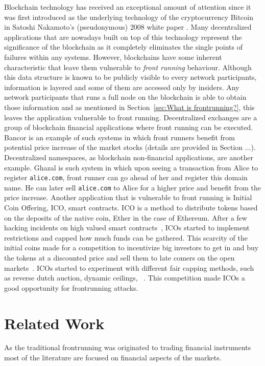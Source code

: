 Blockchain technology has received an exceptional amount of attention since it was first introduced as the underlying technology of the cryptocurrency Bitcoin in Satoshi Nakamoto's (pseudonymous) 2008 white paper \cite{nakamoto2008bitcoin}. Many decentralized applications that are nowadays built on top of this technology represent the significance of the blockchain as it completely eliminates the single points of failures within any systems. However, blockchains have some inherent characteristic that leave them vulnerable to \emph{front running} behaviour. Although this data structure is known to be publicly visible to every network participants, information is layered  and some of them are accessed only by insiders. Any network participants that runs a full node on the blockchain is able to obtain those information and as mentioned in Section~\ref{sec:What is frontrunning?}, this leaves the application vulnerable to front running. Decentralized exchanges are a group of blockchain financial applications where front running can be executed. Bancor \cite{hertzog2017bancor} is an example of such systems in which front runners benefit from potential price increase of the market stocks (details are provided in Section ...). Decentralized namespaces, as blockchain non-financial applications, are another example. Ghazal \cite{moosavighazal} is such system in which upon seeing a transaction from Alice to register \texttt{alice.com}, front runner can go ahead of her and register this domain name. He can later sell \texttt{alice.com} to Alice for a higher price and benefit from the price increase.
Another application that is vulnerable to front running is Initial Coin Offering, ICO, smart contracts. ICO is a method to distribute tokens based on the deposits of the native coin, Ether in the case of Ethereum. After a few hacking incidents on high valued smart contracts~\cite{siegel2016daohack}, ICOs started to implement restrictions and capped how much funds can be gathered. This scarcity of the initial coins made for a competition to incentivize big investors to get in and buy the tokens at a discounted price and sell them to late comers on the open markets~\cite{zetzsche2018ico, li2018initial}. ICOs started to experiment with different fair capping methods, such as reverse dutch auction, dynamic ceilings, \eg ~\cite{kaal2017initial}.  This competition made ICOs a good opportunity for frontrunning attacks. 



\section{Related Work}
As the traditional frontrunning was originated to trading financial instruments most of the literature are focused on financial aspects of the markets. %


